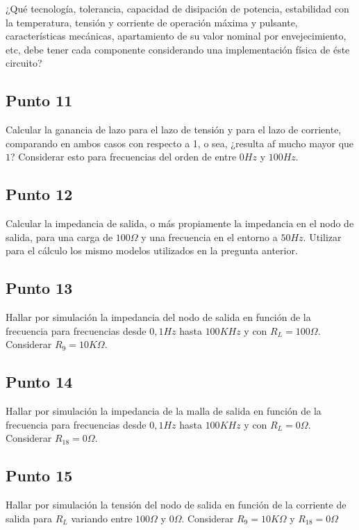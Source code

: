 ¿Qué tecnología, tolerancia, capacidad de disipación de potencia, estabilidad con la temperatura, tensión y corriente de operación máxima y pulsante, características mecánicas, apartamiento de su valor nominal por envejecimiento, etc, debe tener cada componente considerando una implementación física de éste circuito?


\subsection{Punto 11}

Calcular la ganancia de lazo  para el lazo de tensión y para el lazo de corriente, comparando en ambos casos con respecto a 1, o sea, ¿resulta af mucho mayor que $1$? Considerar esto para frecuencias del orden de entre $0 Hz$ y $100 Hz$.


\subsection{Punto 12}

Calcular la impedancia de salida, o más propiamente la impedancia en el nodo de salida, para una carga de $100 \Omega$ y una frecuencia en el entorno a $50Hz$. Utilizar para el cálculo los mismo modelos utilizados en la pregunta anterior.


\subsection{Punto 13}

Hallar por simulación la impedancia del nodo de salida en función de la frecuencia para frecuencias desde $0,1 Hz$ hasta $100 KHz$ y con $R_{L} = 100 \Omega$. Considerar $R_{9} = 10 K\Omega$.


\subsection{Punto 14}

Hallar por simulación la impedancia de la malla de salida en función de la frecuencia para frecuencias desde $0,1 Hz$ hasta $100 KHz$ y con  $R_{L} = 0 \Omega$. Considerar  $R_{18} = 0 \Omega$.


\subsection{Punto 15}

Hallar por simulación la tensión del nodo de salida en función de la corriente de salida para  $R_{L}$ variando entre  $100 \Omega$ y $0 \Omega$. Considerar $R_{9} = 10 K\Omega$ y $R_{18} = 0 \Omega$


